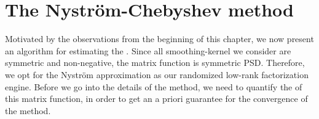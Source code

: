 
\section{The Nystr\"om-Chebyshev method}
\label{sec:3-nystrom-nystrom-chebyshev}

Motivated by the observations from the beginning of this chapter, we now present
an algorithm for estimating the .
Since all \gls{smoothing-kernel} we consider are symmetric
and non-negative, the matrix function  is
symmetric \gls{PSD}. Therefore, we opt for the Nystr\"om approximation 
as our randomized low-rank factorization engine. Before we go into the details
of the method, we need to quantify the  of this matrix
function, in order to get an a priori guarantee for the convergence of the 
method.\\

